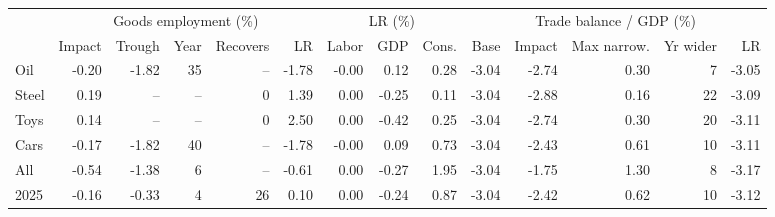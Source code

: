 \begin{tabular}{lrrrrrrrrrrrrr}
\toprule
 & \multicolumn{5}{c}{Goods employment (\%)} & \multicolumn{3}{c}{LR (\%)} & \multicolumn{5}{c}{Trade balance / GDP (\%)} \\
\cmidrule(lr){2-6}\cmidrule(lr){7-9}\cmidrule(lr){10-14}
 & Impact & Trough & Year & Recovers & LR & Labor & GDP & Cons. & Base & Impact & Max narrow. & Yr wider & LR \\
\midrule
Oil & -0.20 & -1.82 & 35 & -- & -1.78 & -0.00 & 0.12 & 0.28 & -3.04 & -2.74 & 0.30 & 7 & -3.05 \\
Steel & 0.19 & -- & -- & 0 & 1.39 & 0.00 & -0.25 & 0.11 & -3.04 & -2.88 & 0.16 & 22 & -3.09 \\
Toys & 0.14 & -- & -- & 0 & 2.50 & 0.00 & -0.42 & 0.25 & -3.04 & -2.74 & 0.30 & 20 & -3.11 \\
Cars & -0.17 & -1.82 & 40 & -- & -1.78 & -0.00 & 0.09 & 0.73 & -3.04 & -2.43 & 0.61 & 10 & -3.11 \\
All & -0.54 & -1.38 & 6 & -- & -0.61 & 0.00 & -0.27 & 1.95 & -3.04 & -1.75 & 1.30 & 8 & -3.17 \\
2025 & -0.16 & -0.33 & 4 & 26 & 0.10 & 0.00 & -0.24 & 0.87 & -3.04 & -2.42 & 0.62 & 10 & -3.12 \\
\bottomrule
\end{tabular}
